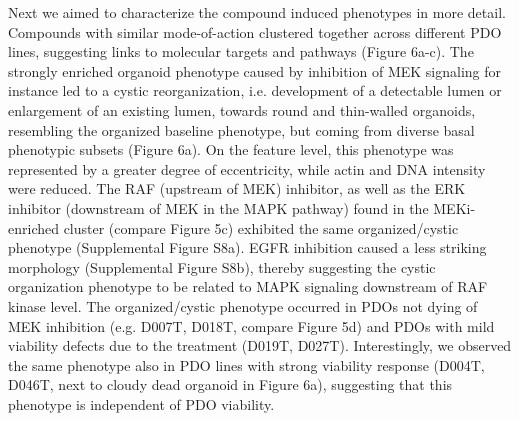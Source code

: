 Next we aimed to characterize the compound induced phenotypes in more detail. Compounds with similar mode-of-action clustered together across different PDO lines, suggesting links to molecular targets and pathways (Figure 6a-c). The strongly enriched organoid phenotype caused by inhibition of MEK signaling for instance led to a cystic reorganization, i.e. development of a detectable lumen or enlargement of an existing lumen, towards round and thin-walled organoids, resembling the organized baseline phenotype, but coming from diverse basal phenotypic subsets (Figure 6a). On the feature level, this phenotype was represented by a greater degree of eccentricity, while actin and DNA intensity were reduced. The RAF (upstream of MEK) inhibitor, as well as the ERK inhibitor (downstream of MEK in the MAPK pathway) found in the MEKi-enriched cluster (compare Figure 5c) exhibited the same organized/cystic phenotype (Supplemental Figure S8a). EGFR inhibition caused a less striking morphology (Supplemental Figure S8b), thereby suggesting the cystic organization phenotype to be related to MAPK signaling downstream of RAF kinase level. The organized/cystic phenotype occurred in PDOs not dying of MEK inhibition (e.g. D007T, D018T, compare Figure 5d) and PDOs with mild viability defects due to the treatment (D019T, D027T). Interestingly, we observed the same phenotype also in PDO lines with strong viability response (D004T, D046T, next to cloudy dead organoid in Figure 6a), suggesting that this phenotype is independent of PDO viability.

